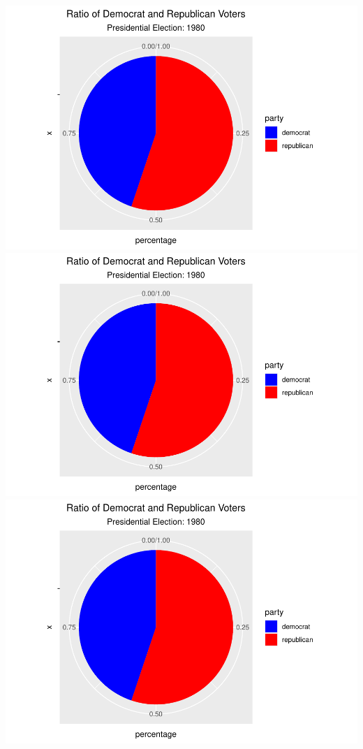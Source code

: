 \documentclass[
]{article}
\begin{document}
\includegraphics{election_files/figure-latex/anim-10.pdf}
\includegraphics{election_files/figure-latex/anim-11.pdf}
\includegraphics{election_files/figure-latex/anim-12.pdf}
\end{document}
